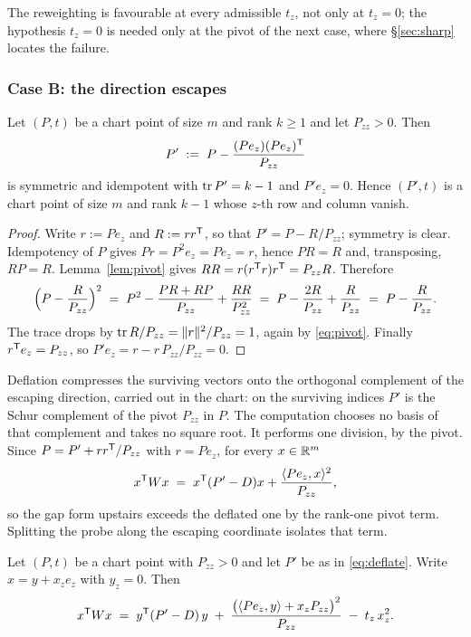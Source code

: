 The reweighting is favourable at every admissible $t_z$, not only at
$t_z=0$; the hypothesis $t_z=0$ is needed only at the pivot of the next
case, where \S\ref{sec:sharp} locates the failure.

\subsubsection*{Case B: the direction escapes}

\begin{lemma}[Lean]\label{lem:deflate}
Let $(P,t)$ be a chart point of size $m$ and rank $k\ge1$ and let
$P_{zz}>0$.  Then
\begin{equation}\label{eq:deflate}
  P'\;:=\;P-\frac{(Pe_z)(Pe_z)^{\mathsf{T}}}{P_{zz}}
\end{equation}
is symmetric and idempotent with $\operatorname{tr} P'=k-1$ and $P'e_z=0$.  Hence
$(P',t)$ is a chart point of size $m$ and rank $k-1$ whose $z$-th row and
column vanish.
\end{lemma}

\begin{proof}
Write $r:=Pe_z$ and $R:=rr^{\mathsf{T}}$, so that $P'=P-R/P_{zz}$; symmetry is
clear.  Idempotency of $P$ gives $Pr=P^{2}e_z=Pe_z=r$, hence $PR=R$ and,
transposing, $RP=R$.  Lemma~\ref{lem:pivot} gives
$RR=r(r^{\mathsf{T}} r)r^{\mathsf{T}}=P_{zz}R$.  Therefore
\[
  \Bigl(P-\frac{R}{P_{zz}}\Bigr)^{2}
  \;=\;P^{2}-\frac{PR+RP}{P_{zz}}+\frac{RR}{P_{zz}^{2}}
  \;=\;P-\frac{2R}{P_{zz}}+\frac{R}{P_{zz}}
  \;=\;P-\frac{R}{P_{zz}} .
\]
The trace drops by $\operatorname{tr} R/P_{zz}=\lVert r\rVert^{2}/P_{zz}=1$, again by
\eqref{eq:pivot}.  Finally $r^{\mathsf{T}} e_z=P_{zz}$, so
$P'e_z=r-r\,P_{zz}/P_{zz}=0$.
\end{proof}

Deflation compresses the surviving vectors onto the orthogonal complement
of the escaping direction, carried out in the chart: on the surviving
indices $P'$ is the Schur complement of the pivot $P_{zz}$ in $P$.  The
computation chooses no basis of that complement and takes no square root.
It performs one division, by the pivot.  Since $P=P'+rr^{\mathsf{T}}/P_{zz}$ with
$r=Pe_z$, for every $x\in\mathbb{R}^m$
\begin{equation}\label{eq:transverse}
  x^{\mathsf{T}} Wx\;=\;x^{\mathsf{T}}(P'-D)x+\frac{\langle Pe_z,x\rangle^{2}}{P_{zz}} ,
\end{equation}
so the gap form upstairs exceeds the deflated one by the rank-one pivot
term.  Splitting the probe along the escaping coordinate isolates that
term.

\begin{lemma}\label{lem:schur}
Let $(P,t)$ be a chart point with $P_{zz}>0$ and let $P'$ be as in
\eqref{eq:deflate}.  Write $x=y+x_ze_z$ with $y_z=0$.  Then
\begin{equation}\label{eq:schur}
  x^{\mathsf{T}} Wx\;=\;y^{\mathsf{T}}(P'-D)\,y
    \;+\;\frac{\bigl(\langle Pe_z,y\rangle+x_zP_{zz}\bigr)^{2}}{P_{zz}}
    \;-\;t_z\,x_z^{2} .
\end{equation}
\end{lemma}

